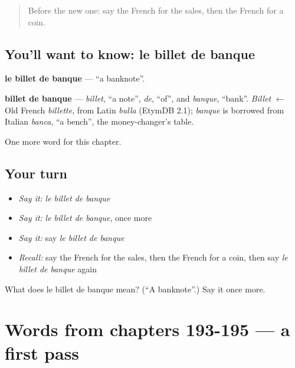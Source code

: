 \label{lesson:FR-C198-billet-de-banque}



\begin{quote}
Before the new one: say the French for the sales, then the French for a coin.
\end{quote}

\subsection*{You'll want to know: le billet de banque}
\textbf{le billet de banque} — \textquotedblleft{}a banknote\textquotedblright{}.

\begin{cousinweb}
\textbf{billet de banque} — \emph{billet}, \textquotedblleft{}a note\textquotedblright{}, \emph{de}, \textquotedblleft{}of\textquotedblright{}, and \emph{banque}, \textquotedblleft{}bank\textquotedblright{}. \emph{Billet} $\leftarrow$ Old French \emph{billette}, from Latin \emph{bulla} (EtymDB 2.1); \emph{banque} is borrowed from Italian \emph{banca}, \textquotedblleft{}a bench\textquotedblright{}, the money-changer's table.
\end{cousinweb}

\begin{grammarlens}[title={What you've built}]
One more word for this chapter.
\end{grammarlens}

\subsection*{Your turn}
\begin{itemize}
\raggedright
  \item \emph{Say it:} \emph{le billet de banque}
  \item \emph{Say it:} \emph{le billet de banque}, once more
  \item \emph{Say it:} say \emph{le billet de banque}
  \item \emph{Recall:} say the French for the sales, then the French for a coin, then say \emph{le billet de banque} again
\end{itemize}

\begin{tcolorbox}[breakable,colback=teal!4,colframe=teal!35!black,title={Before you move on}]
What does le billet de banque mean? (\textquotedblleft{}A banknote\textquotedblright{}.) Say it once more.
\end{tcolorbox}
\section[(dialogue)]{Words from chapters 193-195 — a first pass}

